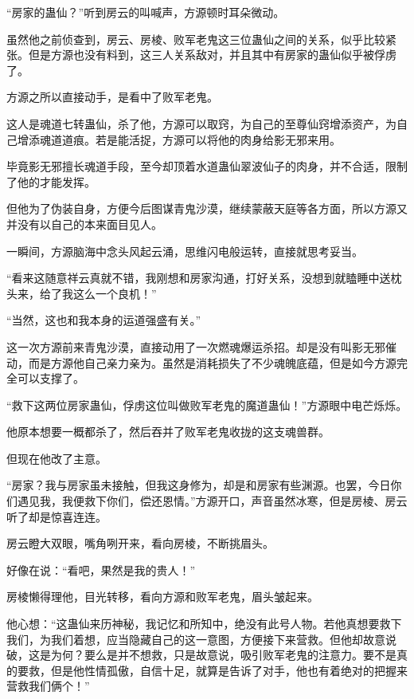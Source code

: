 
\begin{this_body}

“房家的蛊仙？”听到房云的叫喊声，方源顿时耳朵微动。

虽然他之前侦查到，房云、房棱、败军老鬼这三位蛊仙之间的关系，似乎比较紧张。但是方源也没有料到，这三人关系敌对，并且其中有房家的蛊仙似乎被俘虏了。

方源之所以直接动手，是看中了败军老鬼。

这人是魂道七转蛊仙，杀了他，方源可以取窍，为自己的至尊仙窍增添资产，为自己增添魂道道痕。若是能活捉，方源可以将他的肉身给影无邪来用。

毕竟影无邪擅长魂道手段，至今却顶着水道蛊仙翠波仙子的肉身，并不合适，限制了他的才能发挥。

但他为了伪装自身，方便今后图谋青鬼沙漠，继续蒙蔽天庭等各方面，所以方源又并没有以自己的本来面目见人。

一瞬间，方源脑海中念头风起云涌，思维闪电般运转，直接就思考妥当。

“看来这随意祥云真就不错，我刚想和房家沟通，打好关系，没想到就瞌睡中送枕头来，给了我这么一个良机！”

“当然，这也和我本身的运道强盛有关。”

这一次方源前来青鬼沙漠，直接动用了一次燃魂爆运杀招。却是没有叫影无邪催动，而是方源他自己亲力亲为。虽然是消耗损失了不少魂魄底蕴，但是如今方源完全可以支撑了。

“救下这两位房家蛊仙，俘虏这位叫做败军老鬼的魔道蛊仙！”方源眼中电芒烁烁。

他原本想要一概都杀了，然后吞并了败军老鬼收拢的这支魂兽群。

但现在他改了主意。

“房家？我与房家虽未接触，但我这身修为，却是和房家有些渊源。也罢，今日你们遇见我，我便救下你们，偿还恩情。”方源开口，声音虽然冰寒，但是房棱、房云听了却是惊喜连连。

房云瞪大双眼，嘴角咧开来，看向房棱，不断挑眉头。

好像在说：“看吧，果然是我的贵人！”

房棱懒得理他，目光转移，看向方源和败军老鬼，眉头皱起来。

他心想：“这蛊仙来历神秘，我记忆和所知中，绝没有此号人物。若他真想要救下我们，为我们着想，应当隐藏自己的这一意图，方便接下来营救。但他却故意说破，这是为何？要么是并不想救，只是故意说，吸引败军老鬼的注意力。要不是真的要救，但是他性情孤傲，自信十足，就算是告诉了对手，他也有着绝对的把握来营救我们俩个！”


\end{this_body}
